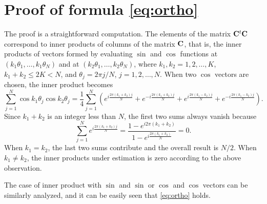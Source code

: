 \section{Proof of formula \eqref{eq:ortho}}
\label{sec:app3}
 The proof is a straightforward computation. The elements of the
matrix $\mathbf{C}^t \mathbf{C}$ correspond to inner products of columns
of the matrix $\mathbf{C}$, that is, the inner products of vectors
formed by evaluating $\sin$ and $\cos$ functions at $(k_1
\theta_1, \ldots, k_1 \theta_N)$ and at $(k_2 \theta_1, \ldots,
k_2 \theta_N)$, where $k_1, k_2 = 1, 2, \ldots, K$, $k_1 + k_2 \le
2K < N$, and $\theta_j = 2\pi j/N$, $j=1, 2, \ldots, N$. When two
$\cos$ vectors are chosen, the inner product becomes
\begin{equation*}
\sum_{j=1}^N \cos k_1 \theta_j \cos k_2 \theta_j =  \frac{1}{4}
\sum_{j=1}^N \left( e^{i\frac{2\pi (k_1 + k_2) j}{N}} +
e^{-i\frac{2\pi (k_1 + k_2) j}{N}} + e^{i\frac{2\pi (k_1 - k_2)
j}{N}} + e^{-i\frac{2\pi (k_1 - k_2) j}{N}} \right).
\end{equation*}
Since $k_1 + k_2$ is an integer less than $N$, the first two sums
always vanish because
\begin{equation*}
\sum_{j=1}^N e^{i\frac{2\pi(k_1 + k_2)j}{N}} = \frac{1-e^{i
2\pi(k_1+k_2)}}{1-e^{i\frac{2\pi(k_1+k_2)}{N}}} = 0.
\end{equation*}
When $k_1 = k_2$, the last two sums contribute and the overall
result is $N/2$. When $k_1 \ne k_2$, the inner products under
estimation is zero according to the above observation.

The case of inner product with $\sin$ and $\sin$ or $\cos$ and
$\cos$ vectors can be similarly analyzed, and it can be easily
seen that \eqref{eq:ortho} holds.
